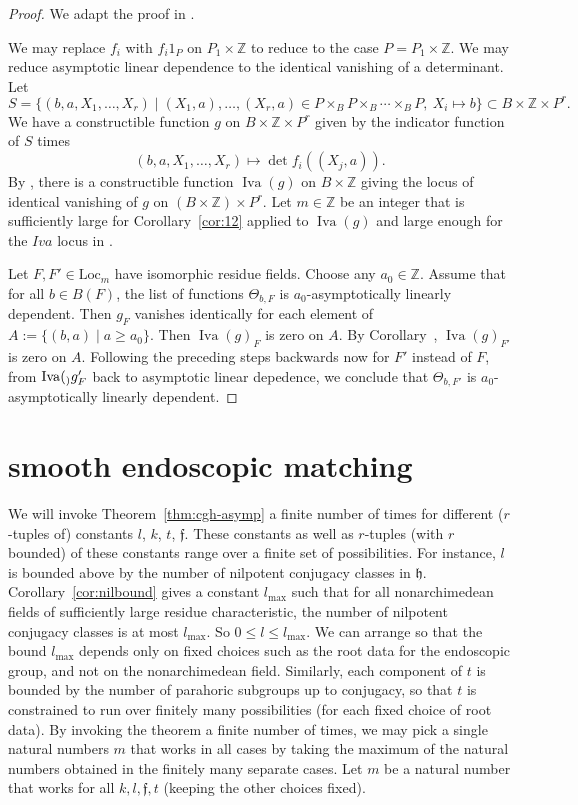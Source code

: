\documentclass[12pt]{amsart}
\newcommand{\op}[1]{\operatorname{#1}}
\newcommand{\ring}[1]{{\mathbb #1}}
\newcommand{\locus}[1]{\op{Iva}(#1)}
\def\s{{\mathfrak{f}}}
\newcommand{\fh}{\mathfrak{h}}
\newcommand{\Loc}{\mathrm{Loc}}
\theoremstyle{plain}
\theoremstyle{definition}
\begin{document}
\begin{proof} We adapt the proof in \cite{CGH2}.

We may replace $f_i$ with $f_i 1_P$ on $P_1\times\ring{Z}$ to reduce
to the case $P=P_1\times\ring{Z}$.  We may reduce asymptotic linear
dependence to the identical vanishing of a determinant.
Let 
\[
S = \{(b,a,X_1,\ldots,X_r)\mid (X_1,a),\ldots,(X_r,a)\in P\times_B
P\times_B\cdots\times_B P,~X_i\mapsto b\} \subset B\times\ring{Z}\times P^r.
\]
We have a constructible function $g$ on $B\times\ring{Z}\times P^r$
given by the indicator function of $S$ times
\[
(b,a,X_1,\ldots,X_r)\mapsto 
\det f_i((X_j,a)).
\]
By \cite{cgh}, there is a constructible function $\locus{g}$ on
$B\times\ring{Z}$ giving the locus of identical vanishing of $g$ on
$(B\times\ring{Z})\times P^r$.
Let $m\in\ring{Z}$ be an integer that is sufficiently large for
Corollary~\ref{cor:12} applied to $\locus{g}$ and large enough for the
$Iva$ locus in \cite{cgh}.

Let $F,F'\in\Loc_m$ have isomorphic residue fields.  Choose any
$a_0\in\ring{Z}$.  Assume that for all $b\in B(F)$, the list of
functions $\Theta_{b,F}$ is $a_0$-asymptotically linearly dependent.
Then $g_F$ vanishes identically for each element of $A:=\{(b,a)\mid
a\ge a_0\}$.  Then $\locus{g}_F$ is zero on $A$.  By
Corollary~\cite{cor:12}, $\locus{g}_{F'}$ is zero on $A$.  Following
the preceding steps backwards now for $F'$ instead of $F$, from
$\locus_{g}_F'$ back to asymptotic linear depedence, we conclude that
$\Theta_{b,F'}$ is $a_0$-asymptotically linearly dependent.
\end{proof}



\section{smooth endoscopic matching}


We will invoke Theorem~\ref{thm:cgh-asymp} a finite number of times for different
($r$-tuples of) constants $l$, $k$, $t$, $\s$.  These constants as
well as $r$-tuples (with $r$ bounded) of these constants range over a
finite set of possibilities.  For instance, $l$ is bounded above by
the number of nilpotent conjugacy classes in $\fh$.  Corollary~\ref{cor:nilbound}
gives a
constant $l_{\op{max}}$ such that for all nonarchimedean fields of
sufficiently large residue characteristic, the number of nilpotent
conjugacy classes is at most $l_{\op{max}}$.  So $0\le l\le
l_{\op{max}}$.  We can arrange so that the bound $l_{\op{max}}$
depends only on fixed choices such as the root data for the endoscopic
group, and not on the nonarchimedean field.  Similarly, each component
of $t$ is bounded by the number of parahoric subgroups up to
conjugacy, so that $t$ is constrained to run over finitely many
possibilities (for each fixed choice of root data). By invoking the
theorem a finite number of times, we may pick a single natural numbers
$m$ that works in all cases by taking the maximum of the natural
numbers obtained in the finitely many separate cases.  Let $m$ be a
natural number that works for all $k,l,\s,t$ (keeping the other
choices fixed).
\end{document}
